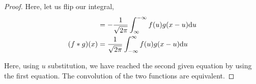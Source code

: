 \begin{proof}
Here, let us flip our integral,
%
\begin{align}
  & =
  -\frac{1}{\sqrt{2 \pi}}
  \int^{-\infty}_\infty
  f(u) g(x - u) \text du\\
  (f * g)(x) & =
  \frac{1}{\sqrt{2 \pi}}
  \int^{\infty}_{-\infty}
  f(u) g(x - u) \text du
\end{align}

Here, using $u$ substitution, we have reached the second given equation by using the first equation. The convolution of the two functions are equivalent.

\end{proof}
